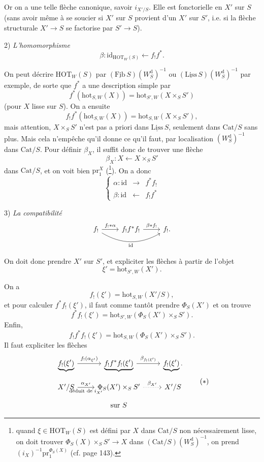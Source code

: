 \documentclass[11pt]{article}
\newcommand{\printedpage}[1]{\marginpar{\footnotesize p.~#1}}
\newcommand{\msp}[1]{\marginpar{\footnotesize [#1]}}
\newcommand{\HOT}{\mathrm{HOT}}
\newcommand{\Cat}{\mathrm{Cat}}
\newcommand{\id}{\mathrm{id}}
\newcommand{\hot}{\mathrm{hot}}
\newcommand{\pr}{\mathrm{pr}}
\newcommand{\Wd}{W^{\mathrm{d}}}
\begin{document}
\printedpage{85}
Or on a une telle flèche canonique, savoir $i_{X'/S}$. Elle est fonctorielle en $X'$ sur $S$ (sans avoir même à se soucier si $X'$ sur $S$ provient d'un $X'$ sur $S'$, i.e. si la flèche structurale $X'\longrightarrow S$ se factorise par $S'\longrightarrow S$).

\leavevmode\msp{page 140}2) \textit{L'homomorphisme}
\[
\beta : \id_{\HOT_W(S)} \longleftarrow f_!f^*.
\]

On peut décrire $\HOT_W(S)$ par $(\underline{\mathrm{Fib}}\,S)(\Wd_S)^{-1}$ ou $(\underline{\mathrm{Liss}}\,S)(\Wd_S)^{-1}$ par exemple, de sorte que $f^*$ a une description simple par
\[
f^*(\hot_{S,W}(X)) = \hot_{S',W}(X\times_S S')
\]
(pour $X$ lisse sur $S$). On a ensuite
\[
f_!f^*(\hot_{S,W}(X)) = \hot_{S,W}(X\times_S S'),
\]
mais attention, $X\times_S S'$ n'est pas a priori dans $\underline{\mathrm{Liss}}\,S$, seulement dans $\Cat/S$ sans plus. Mais cela n'empêche qu'il donne ce qu'il faut, par localisation $(\Wd_S)^{-1}$ dans $\Cat/S$. Pour définir $\beta_X$, il suffit donc de trouver une flèche
\[
\beta_X : X \longleftarrow X\times_S S'
\]
dans $\Cat/S$, et on voit bien $\pr_1^X$ (\footnote[68]{quand $\xi\in\HOT_W(S)$ est défini par $X$ dans $\Cat/S$ non nécessairement lisse, on doit trouver $\Phi_S(X)\times_S S'\longrightarrow X$ dans $(\Cat/S)(\Wd_S)^{-1}$, on prend $(i_X)^{-1}\pr_1^{\Phi_S(X)}$ (cf. page 143).}). On a donc
\[
\left\{
\begin{array}{lcl}
\alpha : \id & \longrightarrow & f^*f_! \\
\beta : \id & \longleftarrow & f_!f^*
\end{array}
\right.
\]

3) \textit{La compatibilité}
\[
\begin{tikzcd}
f_! \arrow[r, "f_!*\alpha"] \arrow[rr, bend right, "\id"'] & f_!f^*f_! \arrow[r, "\beta*f_!"] & f_!.
\end{tikzcd}
\]

On doit donc prendre $X'$ sur $S'$, et expliciter les flèches à partir de l'objet
\[
\xi' = \hot_{S',W}(X').
\]

\printedpage{86}
\leavevmode\msp{page 141}On a
\[
f_!(\xi') = \hot_{S,W}(X'/S),
\]
et pour calculer $f^*f_!(\xi')$, il faut comme tantôt prendre $\Phi_S(X')$ et on trouve
\[
f^*f_!(\xi') = \hot_{S',W}(\Phi_S(X')\times_S S').
\]
Enfin,
\[
f_!f^*f_!(\xi') = \hot_{S,W}(\Phi_S(X')\times_S S').
\]
Il faut expliciter les flèches
\[
\begin{tikzcd}[row sep=small]
\underbrace{f_!(\xi')} \arrow[r, "{f_!(\alpha_{\xi'})}"] & \underbrace{f_!f^*f_!(\xi')} \arrow[r, "{\beta_{f_!(\xi')}}"] & \underbrace{f_!(\xi')}. \\
X'/S \arrow[r, "{\alpha_{X'}}", "{\text{déduit de } i_{X'}}"'] & \Phi_S(X')\times_S S' \arrow[r, dotted, "{\beta_{X'}}"] & X'/S \\
 & \text{sur } S &
\end{tikzcd}
\tag*{$(*)$}
\]
\end{document}
